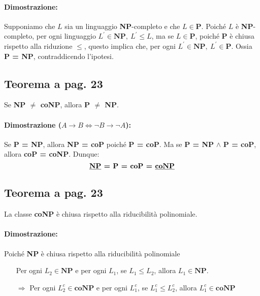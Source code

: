 \paragraph*{Dimostrazione:} 

Supponiamo che $L$ sia un linguaggio \textbf{NP}-completo e che $L \in \textbf{P}$. Poiché $L$ è \textbf{NP}-completo, per ogni
linguaggio $L^{'} \in \textbf{NP},\ L^{'} \leq L$, ma se $L \in \textbf{P}$, poiché \textbf{P} è chiusa rispetto alla 
riduzione $\leq$, questo implica che, per ogni $L^{'} \in \textbf{NP},\ L^{'} \in \textbf{P}$. Ossia \textbf{P = NP}, 
contraddicendo l'ipotesi.

\subsection{Teorema a pag. 23}

Se \textbf{NP $\neq$ coNP}, allora \textbf{P $\neq$ NP}.

\paragraph*{Dimostrazione ($A\rightarrow B \Leftrightarrow \lnot B \rightarrow \lnot A$): }

Se \textbf{P = NP}, allora \textbf{NP = coP} poiché \textbf{P = coP}. Ma se \textbf{P = NP} $\land$ \textbf{P = coP}, allora 
\textbf{coP = coNP}. Dunque: $$\textbf{\underline{NP} = P = coP = \underline{coNP}}$$ 

\subsection{Teorema a pag. 23}

La classe \textbf{coNP} è chiusa rispetto alla riducibilità polinomiale.

\paragraph*{Dimostrazione: }

Poiché \textbf{NP} è chiusa rispetto alla riducibilità polinomiale
\begin{itemize}
    \item [] Per ogni $L_{2} \in \textbf{NP}$ e per ogni $L_{1}$, se $L_{1} \leq L_{2}$, allora $L_{1} \in \textbf{NP}$.
    \item [$\Rightarrow$] Per ogni $L_{2}^{c} \in \textbf{coNP}$ e per ogni $L_{1}^{c}$, se $L_{1}^{c} \leq L_{2}^{c}$, allora $L_{1}^{c} \in \textbf{coNP}$
\end{itemize}

